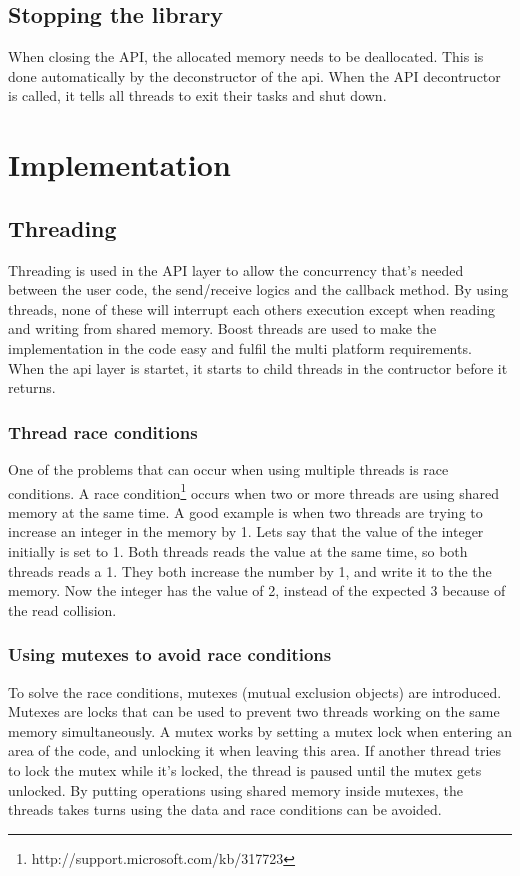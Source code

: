 \subsection{Stopping the library}
When closing the API, the allocated memory needs to be deallocated. This is done automatically by the deconstructor of the api. When the API decontructor is called, it tells all threads to exit their tasks and shut down.

\section{Implementation}
\subsection{Threading}
\label{threading}
Threading is used in the API layer to allow the concurrency that's needed between the user code, the send/receive logics and the callback method. By using threads, none of these will interrupt each others execution except when reading and writing from shared memory. Boost threads are used to make the implementation in the code easy and fulfil the multi platform requirements. When the api layer is startet, it starts to child threads in the contructor before it returns.

\subsubsection{Thread race conditions}
\label{thread_race_conditions}
One of the problems that can occur when using multiple threads is race conditions. A race condition\footnote{http://support.microsoft.com/kb/317723} occurs when two or more threads are using shared memory at the same time. A good example is when two threads are trying to increase an integer in the memory by 1. Lets say that the value of the integer initially is set to 1. Both threads reads the value at the same time, so both threads reads a 1. They both increase the number by 1, and write it to the the memory. Now the integer has the value of 2, instead of the expected 3 because of the read collision.

\subsubsection{Using mutexes to avoid race conditions}
\label{mutex}
To solve the race conditions, mutexes (mutual exclusion objects) are introduced. Mutexes are locks that can be used to prevent two threads working on the same memory simultaneously. A mutex works by setting a mutex lock when entering an area of the code, and unlocking it when leaving this area. If another thread tries to lock the mutex while it's locked, the thread is paused until the mutex gets unlocked. By putting operations using shared memory inside mutexes, the threads takes turns using the data and race conditions can be avoided.

